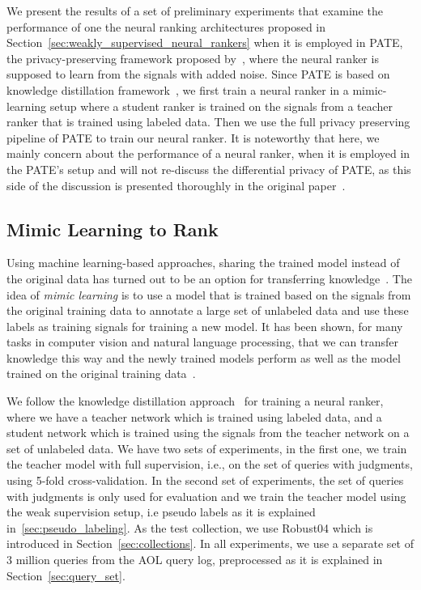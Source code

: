 We present the results of a set of preliminary experiments that examine the performance of one the neural ranking architectures proposed in Section~\ref{sec:weakly_supervised_neural_rankers} when it is employed in PATE, the privacy-preserving framework proposed by~\citet{Papernot:2017}, where the neural ranker is supposed to learn from the signals with added noise. 
Since PATE is based on knowledge distillation framework~\cite{Hinton:2015}, we first train a neural ranker in a mimic-learning setup where a student ranker is trained on the signals from a teacher ranker that is trained using labeled data. Then we use the full privacy preserving pipeline of PATE to train our neural ranker.
%
It is noteworthy that here, we mainly concern about the performance of a neural ranker, when it is employed in the PATE's setup and will not re-discuss the differential privacy of PATE, as this side of the discussion is presented thoroughly in the original paper~\citep{Papernot:2017}.

\subsection{Mimic Learning to Rank}
\label{sec:mimic_learning_to_rank}
Using machine learning-based approaches, sharing the trained model instead of the original data has turned out to be an option for transferring knowledge~\citep{Papernot:2017,Shokri:2015,Abadi:2016}. 
The idea of \emph{mimic learning} is to use a model that is trained based on the signals from the original training data to annotate a large set of unlabeled data and use these labels as training signals for training a new model. 
It has been shown, for many tasks in computer vision and natural language processing, that we can transfer knowledge this way and the newly trained models perform as well as the model trained on the original training data~\citep{Bucilua:2006,Hinton:2015,Romero:2014,Ba:2014}.

We follow the knowledge distillation approach~\cite{Hinton:2015} for training a neural ranker, where we have a teacher network which is trained using labeled data, and a student network which is trained using the signals from the teacher network on a set of unlabeled data. We have two sets of experiments, in the first one, we train the teacher model with full supervision, i.e., on the set of queries with judgments, using 5-fold cross-validation. 
In the second set of experiments, the set of queries with judgments is only used for evaluation and we train the teacher model using the weak supervision setup, i.e pseudo labels as it is explained in~\ref{sec:pseudo_labeling}. 
As the test collection, we use Robust04 which is introduced in Section~\ref{sec:collections}. In all experiments, we use a separate set of $3$ million queries from the AOL query log, preprocessed as it is explained in Section~\ref{sec:query_set}.

